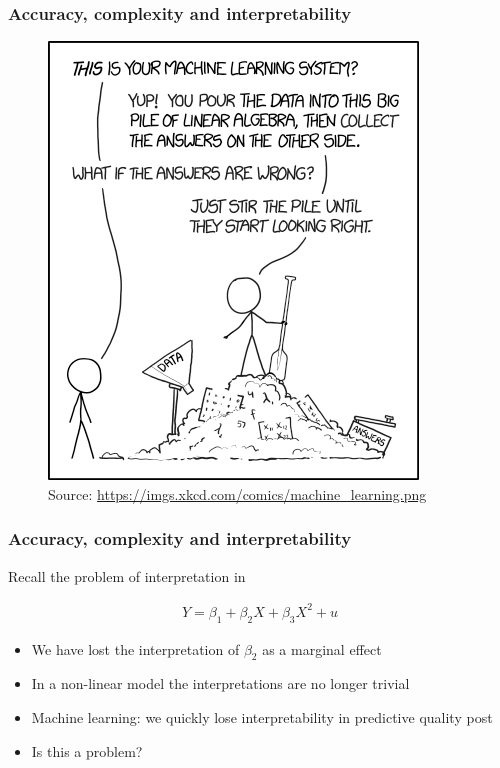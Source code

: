 \documentclass[
  shownotes,
  xcolor={svgnames},
  hyperref={colorlinks,citecolor=DarkBlue,linkcolor=DarkRed,urlcolor=DarkBlue}
  ]{beamer}
\begin{document}
\begin{frame}
\frametitle{Accuracy, complexity and interpretability}

\begin{figure}[H] \centering
  \centering
  \includegraphics[scale=0.35]{figures/machine_learning}
  \\
  \tiny
  Source: \url{https://imgs.xkcd.com/comics/machine_learning.png}
\end{figure}

\end{frame}


\begin{frame}
\frametitle{Accuracy, complexity and interpretability}

Recall the problem of interpretation in

\begin{align}
Y=\beta_1+\beta_2 X+\beta_3 X^2+u
\end{align}

\begin{itemize}
  \item We have lost the interpretation of $\beta_2$ as a marginal effect
  \item In a non-linear model the interpretations are no longer trivial
  \item Machine learning: we quickly lose interpretability in predictive quality post
  \item Is this a problem?
\end{itemize}
\end{frame}
\end{document}
